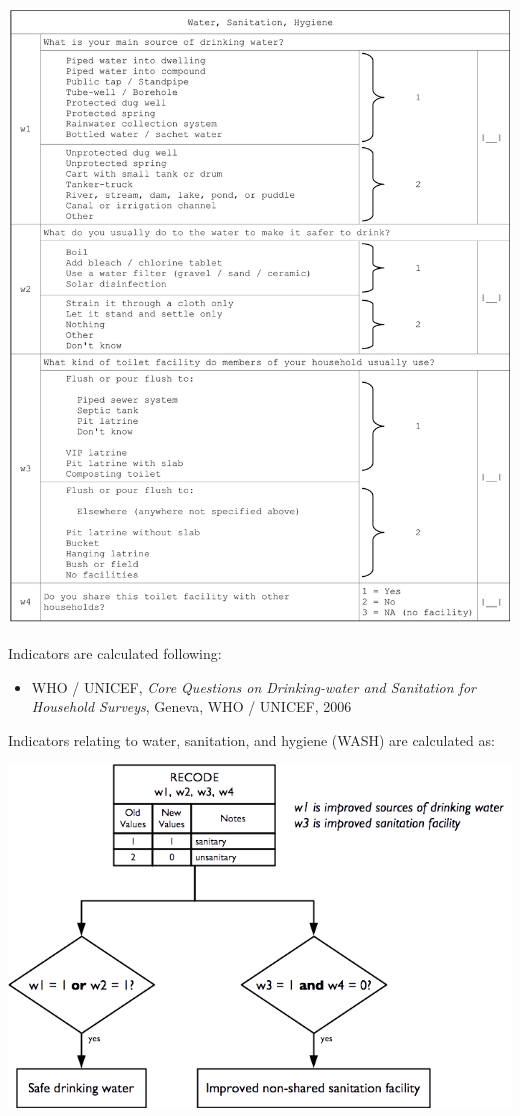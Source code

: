 \documentclass[12pt,a4paper]{book}
\providecommand{\tightlist}{%
  \setlength{\itemsep}{0pt}\setlength{\parskip}{0pt}}
\theoremstyle{definition}
\theoremstyle{definition}
\theoremstyle{definition}
\theoremstyle{remark}
\begin{document}
\begin{center}\includegraphics[width=23.85in]{figures/questionnaire10} \end{center}

\newpage

Indicators are calculated following:

\begin{itemize}
\tightlist
\item
  WHO / UNICEF, \emph{Core Questions on Drinking-water and Sanitation
  for Household Surveys}, Geneva, WHO / UNICEF, 2006
\end{itemize}

Indicators relating to water, sanitation, and hygiene (WASH) are
calculated as:

\begin{center}\includegraphics[width=9.76in]{figures/indicators24} \end{center}
\end{document}
